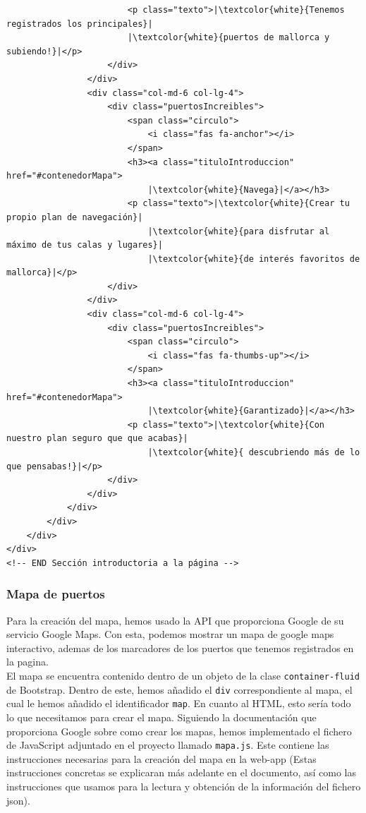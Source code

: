\documentclass{article}
\begin{document}
\begin{verbatim}
                        <p class="texto">|\textcolor{white}{Tenemos registrados los principales}|
                        |\textcolor{white}{puertos de mallorca y subiendo!}|</p>
                    </div>
                </div>
                <div class="col-md-6 col-lg-4">
                    <div class="puertosIncreibles">
                        <span class="circulo">
                            <i class="fas fa-anchor"></i>
                        </span>
                        <h3><a class="tituloIntroduccion" href="#contenedorMapa">
                            |\textcolor{white}{Navega}|</a></h3>
                        <p class="texto">|\textcolor{white}{Crear tu propio plan de navegación}|
                            |\textcolor{white}{para disfrutar al máximo de tus calas y lugares}|
                            |\textcolor{white}{de interés favoritos de mallorca}|</p>
                    </div>
                </div>
                <div class="col-md-6 col-lg-4">
                    <div class="puertosIncreibles">
                        <span class="circulo">
                            <i class="fas fa-thumbs-up"></i>
                        </span>
                        <h3><a class="tituloIntroduccion" href="#contenedorMapa">
                            |\textcolor{white}{Garantizado}|</a></h3>
                        <p class="texto">|\textcolor{white}{Con nuestro plan seguro que que acabas}| 
                            |\textcolor{white}{ descubriendo más de lo que pensabas!}|</p>
                    </div>
                </div>
            </div>
        </div>
    </div>
</div>
<!-- END Sección introductoria a la página -->
\end{verbatim}

\subsubsection{Mapa de puertos}
Para la creación del mapa, hemos usado la API que proporciona Google de su servicio Google Maps. Con esta, podemos mostrar un mapa de google maps interactivo, ademas de los marcadores de los puertos que tenemos registrados en la pagina.\\

\noindent El mapa se encuentra contenido dentro de un objeto de la clase \texttt{container-fluid} de Bootstrap. Dentro de este, hemos añadido el \texttt{div} correspondiente al mapa, el cual le hemos añadido el identificador \texttt{map}. En cuanto al HTML, esto sería todo lo que necesitamos para crear el mapa. Siguiendo la documentación que proporciona Google sobre como crear los mapas, hemos implementado el fichero de JavaScript adjuntado en el proyecto llamado \texttt{mapa.js}. Este contiene las instrucciones necesarias para la creación del mapa en la web-app (Estas instrucciones concretas se explicaran más adelante en el documento, así como las instrucciones que usamos para la lectura y obtención de la información del fichero json).\\
\end{document}
